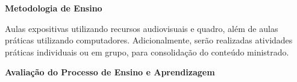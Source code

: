 
 

 



\begin{snugshade}\begin{center}\textbf{
    Metodologia de Ensino
}\end{center}\end{snugshade} 

\noindent
   Aulas expositivas utilizando recursos audiovisuais e quadro, além de aulas práticas utilizando computadores. Adicionalmente, serão realizadas atividades práticas individuais ou em grupo, para consolidação do conteúdo ministrado.

\begin{snugshade}\begin{center}\textbf{
    Avaliação do Processo de Ensino e Aprendizagem
}\end{center}\end{snugshade}   

